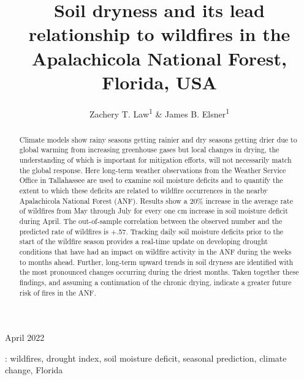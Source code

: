 \documentclass[12pt]{iopart}
\begin{document}
\rhead{\thepage}
\renewcommand{\headrulewidth}{0pt}

\linenumbers

\title{Soil dryness and its lead relationship to wildfires in the Apalachicola National Forest, Florida, USA}

\author{Zachery T. Law\textsuperscript{1} \& James B. Elsner\textsuperscript{1}}

\address{\textsuperscript{1}Department of Geography, Florida State University, Tallahassee, FL 32306, USA}

\vspace{10pt}
\begin{indented}
\item[]April 2022
\end{indented}

\begin{abstract}

Climate models show rainy seasons getting rainier and dry seasons getting drier due to global warming from increasing greenhouse gases but local changes in drying, the understanding of which is important for mitigation efforts, will not necessarily match the global response. Here long-term weather observations from the Weather Service Office in Tallahassee are used to examine soil moisture deficits and to quantify the extent to which these deficits are related to wildfire occurrences in the nearby Apalachicola National Forest (ANF). Results show a 20\% increase in the average rate of wildfires from May through July for every one cm increase in soil moisture deficit during April. The out-of-sample correlation between the observed number and the predicted rate of wildfires is $+$.57. Tracking daily soil moisture deficits prior to the start of the wildfire season provides a real-time update on developing drought conditions that have had an impact on wildfire activity in the ANF during the weeks to months ahead. Further, long-term upward trends in soil dryness are identified with the most pronounced changes occurring during the driest months. Taken together these findings, and assuming a continuation of the chronic drying, indicate a greater future risk of fires in the ANF.%


\end{abstract}
%
: wildfires, drought index, soil moisture deficit, seasonal prediction, climate change, Florida
\end{document}
